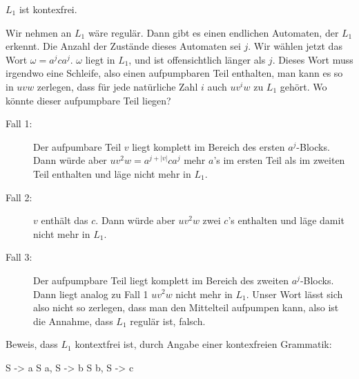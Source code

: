 \documentclass{bschlangaul-aufgabe}
\begin{document}
\begin{bAntwort}
$L_1$ ist kontexfrei.


\noindent
Wir nehmen an $L_1$ wäre regulär. Dann gibt es einen endlichen
Automaten, der $L_1$ erkennt. Die Anzahl der Zustände dieses Automaten
sei $j$. Wir wählen jetzt das Wort $\omega = a^j c a^j$. $\omega$ liegt
in $L_1$, und ist offensichtlich länger als $j$. Dieses Wort muss
irgendwo eine Schleife, also einen aufpumpbaren Teil enthalten, \dh
man kann es so in $uvw$ zerlegen, dass für jede natürliche Zahl $i$ auch
$uv^iw$ zu $L_1$ gehört. Wo könnte dieser aufpumpbare Teil liegen?

\begin{description}
\item[Fall 1:]

Der aufpumbare Teil $v$ liegt komplett im Bereich des ersten
$a^j$-Blocks. Dann würde aber $uv^2w = a^{j + |v|} c a^j$ mehr $a$’s im
ersten Teil als im zweiten Teil enthalten und läge nicht mehr in $L_1$.

\item[Fall 2:]

$v$ enthält das $c$. Dann würde aber $u v^2 w$ zwei $c$’s enthalten und
läge damit nicht mehr in $L_1$.

\item[Fall 3:]

Der aufpumpbare Teil liegt komplett im Bereich des zweiten $a^j$-Blocks.
Dann liegt analog zu Fall 1 $u v^2 w$ nicht mehr in $L_1$. Unser Wort
lässt sich also nicht so zerlegen, dass man den Mittelteil aufpumpen
kann, also ist die Annahme, dass $L_1$ regulär ist, falsch.
\end{description}
\noindent
Beweis, dass $L_1$ kontextfrei ist, durch Angabe einer kontexfreien
Grammatik:

\noindent
\begin{bProduktionsRegeln}
S -> a S a,
S -> b S b,
S -> c
\end{bProduktionsRegeln}
\end{bAntwort}
\end{document}

